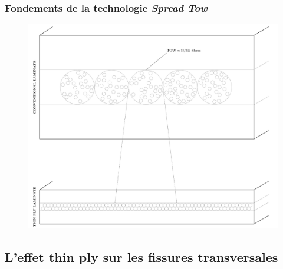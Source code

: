 \documentclass[first,firstsupp,lastsupp,handout,last,hyperref,table]{ETHclass}
\begin{document}
\begin{frame}
\frametitle{Fondements de la technologie \textit{Spread Tow}}
\vspace{-0.5cm}
\centering
\begin{figure}
\centering
\includegraphics[height=0.85\textheight]{spread-tow-tech.pdf}
\label{fig:spread-tow-schematic}
\end{figure}
\end{frame}

\subsection{L'effet thin ply sur les fissures transversales}
\end{document}
